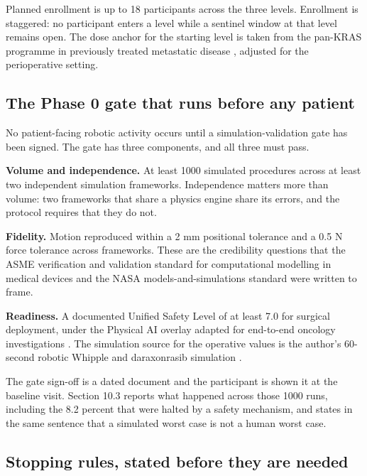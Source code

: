 \vspace{0.30em}

\noindent Planned enrollment is up to 18 participants across the three levels.
Enrollment is staggered: no participant enters a level while a sentinel window
at that level remains open. The dose anchor for the starting level is taken from
the pan-KRAS programme in previously treated metastatic disease
\cite{rasolute302, oreilly2026darax}, adjusted for the perioperative setting.

\subsection{The Phase 0 gate that runs before any patient}

No patient-facing robotic activity occurs until a simulation-validation gate has
been signed. The gate has three components, and all three must pass.

\textbf{Volume and independence.} At least 1000 simulated procedures across at
least two independent simulation frameworks. Independence matters more than
volume: two frameworks that share a physics engine share its errors, and the
protocol requires that they do not.

\textbf{Fidelity.} Motion reproduced within a 2 mm positional tolerance and a
0.5 N force tolerance across frameworks. These are the credibility questions
that the ASME verification and validation standard for computational modelling
in medical devices \cite{asmevv40} and the NASA models-and-simulations standard
\cite{nasastd7009} were written to frame.

\textbf{Readiness.} A documented Unified Safety Level of at least 7.0 for
surgical deployment, under the Physical AI overlay adapted for end-to-end
oncology investigations \cite{cfr312paiuni}. The simulation source for the
operative values is the author's 60-second robotic Whipple and daraxonrasib
simulation \cite{pdac060s2030}.

The gate sign-off is a dated document and the participant is shown it at the
baseline visit. Section 10.3 reports what happened across those 1000 runs,
including the 8.2 percent that were halted by a safety mechanism, and states in
the same sentence that a simulated worst case is not a human worst case.

\subsection{Stopping rules, stated before they are needed}

